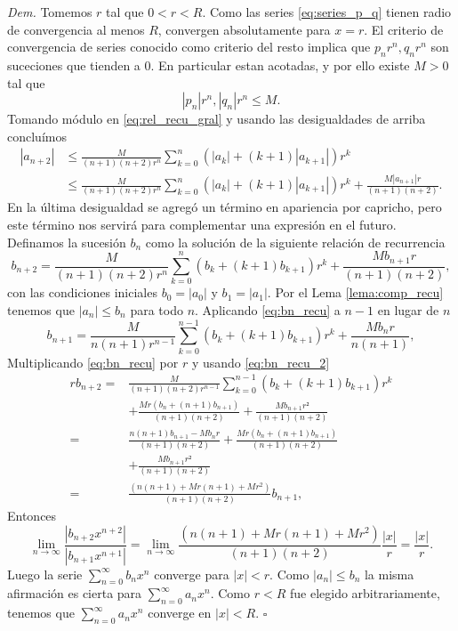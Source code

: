 \documentclass{article}
\newenvironment{demo}{\noindent\emph{Dem.}}{$\square$ \newline\vspace{5pt}}
\begin{document}
\begin{demo}
Tomemos $r$ tal que $0<r<R$. Como las series \eqref{eq:series_p_q} tienen radio de convergencia al menos  $R$,  convergen absolutamente para $x=r$. El criterio de convergencia de series conocido como criterio del resto implica que $p_nr^n,q_nr^n$ son suceciones que tienden a $0$. En particular estan acotadas, y por ello existe $M>0$ tal que
\[ |p_n|r^n,|q_n|r^n\leq M.\]
Tomando módulo en \eqref{eq:rel_recu_gral} y usando las desigualdades de arriba concluímos
\[
  \begin{split}
    |a_{n+2}|&\leq\frac{M}{(n+1)(n+2)r^n} \sum_{k=0}^n\left(|a_k|+ (k+1)|a_{k+1}|\right)r^k\\
&\leq\frac{M}{(n+1)(n+2)r^n} \sum_{k=0}^n\left(|a_k|+ (k+1)|a_{k+1}|\right)r^k+\frac{M|a_{n+1}|r}{(n+1)(n+2)}.
  \end{split}
  \]
En la última desigualdad se agregó un término en apariencia por capricho, pero este término nos servirá para complementar una expresión en el futuro. Definamos la sucesión $b_n$ como la solución de la siguiente relación de recurrencia
\begin{equation}\label{eq:bn_recu}b_{n+2}=\frac{M}{(n+1)(n+2)r^n} \sum_{k=0}^n\left(b_k+ (k+1)b_{k+1}\right)r^k+\frac{Mb_{n+1}r}{(n+1)(n+2)},
\end{equation}
con las condiciones iniciales $b_0=|a_0|$ y $b_1=|a_1|$. Por el Lema \ref{lema:comp_recu} tenemos que $|a_n|\leq b_n$ para todo $n$. Aplicando \eqref{eq:bn_recu} a $n-1$ en lugar de $n$
\begin{equation}\label{eq:bn_recu_2}b_{n+1}=\frac{M}{n(n+1)r^{n-1}} \sum_{k=0}^{n-1}\left(b_k+ (k+1)b_{k+1}\right)r^k+\frac{Mb_{n}r}{n(n+1)},
\end{equation}
Multiplicando  \eqref{eq:bn_recu} por $r$ y usando \ref{eq:bn_recu_2}
\[
\begin{split}
rb_{n+2}=&\frac{M}{(n+1)(n+2)r^{n-1}} \sum_{k=0}^{n-1}\left(b_k+ (k+1)b_{k+1}\right)r^k\\
&+\frac{Mr\left(b_n+ (n+1)b_{n+1}\right)}{(n+1)(n+2)}+\frac{Mb_{n+1}r²}{(n+1)(n+2)}\\
=&\frac{n(n+1)b_{n+1}-Mb_nr}{(n+1)(n+2)}
+\frac{Mr\left(b_n+ (n+1)b_{n+1}\right)}{(n+1)(n+2)}\\
&+\frac{Mb_{n+1}r²}{(n+1)(n+2)}\\
=&\frac{(n(n+1)+Mr(n+1)+Mr^2)}{(n+1)(n+2)}b_{n+1},
\end{split}
\]
Entonces 
\[\lim_{n\to\infty}\frac{|b_{n+2}x^{n+2}|}{|b_{n+1}x^{n+1}|}=\lim_{n\to\infty}\frac{(n(n+1)+Mr(n+1)+Mr^2)}{(n+1)(n+2)}\frac{|x|}{r}=\frac{|x|}{r}.
\]
Luego la serie $\sum_{n=0}^{\infty}b_nx^n$ converge para $|x|<r$. Como $|a_n|\leq b_n$ la misma afirmación es cierta para $\sum_{n=0}^{\infty}a_nx^n$. Como $r<R$ fue elegido arbitrariamente, tenemos que $\sum_{n=0}^{\infty}a_nx^n$ converge en $|x|<R$.
\end{demo}
\end{document}
